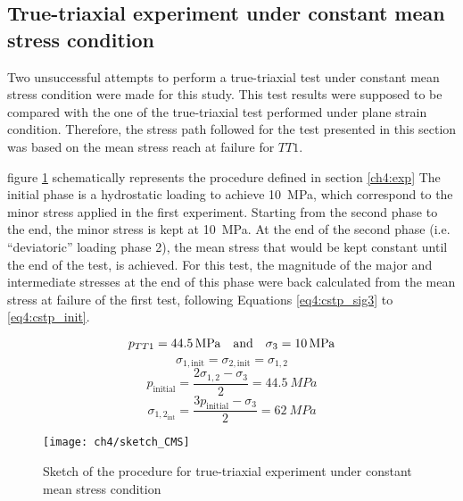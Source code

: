 \subsection{True-triaxial experiment under constant mean stress condition}

Two unsuccessful attempts to perform a true-triaxial test under constant mean stress condition were made for this study. This test results were supposed to be compared with the one of the true-triaxial test performed under plane strain condition. Therefore, the stress path followed for the test presented in this section was based on the mean stress reach at failure for $TT1$.

figure \ref{fig4:16} schematically represents the procedure defined in section \ref{ch4:exp} The initial phase is a hydrostatic loading to achieve \SI{10}{MPa}, which correspond to the minor stress applied in the first experiment. Starting from the second phase to the end, the minor stress is kept at \SI{10}{MPa}. At the end of the second phase (i.e. “deviatoric” loading phase 2), the mean stress that would be kept constant until the end of the test, is achieved. For this test, the magnitude of the major and intermediate stresses at the end of this phase were back calculated from the mean stress at failure of the first test, following Equations \ref{eq4:cstp_sig3} to \ref{eq4:cstp_init}.

\begin{equation}\label{eq4:cstp_sig3}
    p_{TT1} = \SI{44.5}{MPa} \quad \textmd{and} \quad \sigma_3 = \SI{10}{MPa}
\end{equation}
\begin{equation}
    \sigma_{1,\text{init}} = \sigma_{2,\text{init}} = \sigma_{1,2}
\end{equation}
\begin{equation}
    p_\text{initial} = \frac{2\sigma_{1,2}-\sigma_3}{2} = \SI{44.5}{MPa}
\end{equation}
\begin{equation}\label{eq4:cstp_init}
    \sigma_{1,2_{\text{int}}} = \frac{3p_\text{initial}-\sigma_3}{2} = \SI{62}{MPa}
\end{equation}
    

\begin{figure}[tb]
    \centering
    \texttt{[image: ch4/sketch\_CMS]}
    \caption{Sketch of the procedure for true-triaxial experiment under constant mean stress condition}
    \label{fig4:16}
\end{figure} 

